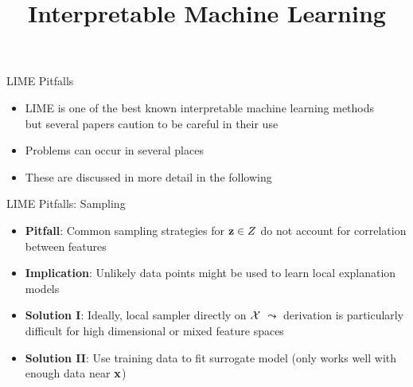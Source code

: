 \documentclass[11pt,compress,t,notes=noshow, aspectratio=169, xcolor=table]{beamer}
\title{Interpretable Machine Learning}
\date{}
\begin{document}
	
	
	
	
	
	\newcommand{\titlefigure}{figure/lime5}
    \newcommand{\learninggoals}{
    	\item Learn why LIME should be used with caution
    	\item Possible pitfalls of LIME}
	
	
	


\begin{vbframe}[c]{LIME Pitfalls}
  \begin{itemize}
  	\item LIME is one of the best known interpretable machine learning methods\\ but several papers caution to be careful in their use 
  	\item Problems can occur in several places 
  	\item These are discussed in more detail in the following 
  \end{itemize}
  
\end{vbframe}
  
\begin{vbframe}[c]{LIME Pitfalls: Sampling}
	\begin{itemize}
	\itemsep1em
	  \item \textbf{Pitfall}: Common sampling strategies for $\zv \in Z$ do not account for correlation between features 
      \item \textbf{Implication}:  Unlikely data points might be used to learn local explanation models
      \item \textbf{Solution I}: Ideally, local sampler directly on $\Xspace$ $\leadsto$ derivation is particularly difficult for high dimensional or mixed feature spaces 
      \item \textbf{Solution II}: Use training data to fit surrogate model (only works well with enough data near $\xv$)
    \end{itemize}
    
\end{vbframe}
\end{document}
